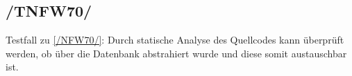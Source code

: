 \subsection*{/TNFW70/}

\label{/TNFW70/} Testfall zu \ref{/NFW70/}: Durch \gls{statische Analyse} des \Gls{Quellcode}s kann überprüft werden, ob über die \Gls{Datenbank} abstrahiert wurde und diese somit austauschbar ist.